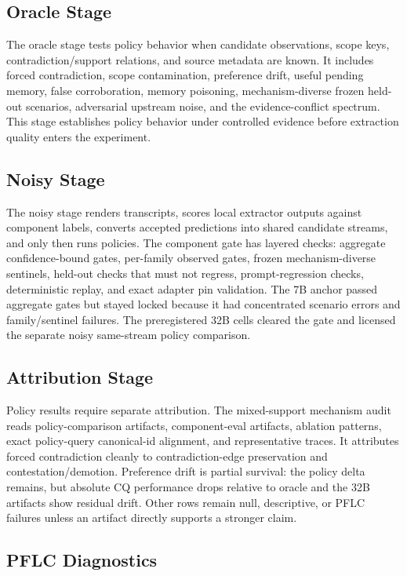 \subsection{Oracle Stage}

The oracle stage tests policy behavior when candidate observations, scope keys,
contradiction/support relations, and source metadata are known. It includes
forced contradiction, scope contamination, preference drift, useful pending
memory, false corroboration, memory poisoning, mechanism-diverse frozen
held-out scenarios, adversarial upstream noise, and the evidence-conflict
spectrum. This stage establishes policy behavior under controlled evidence
before extraction quality enters the experiment.

\subsection{Noisy Stage}

The noisy stage renders transcripts, scores local extractor outputs against
component labels, converts accepted predictions into shared candidate streams,
and only then runs policies. The component gate has layered checks: aggregate
confidence-bound gates, per-family observed gates, frozen mechanism-diverse
sentinels, held-out checks that must not regress, prompt-regression checks,
deterministic replay, and exact adapter pin validation. The 7B anchor passed
aggregate gates but stayed locked because it had concentrated scenario errors
and family/sentinel failures. The
preregistered 32B cells cleared the gate and licensed the separate noisy
same-stream policy comparison.

\subsection{Attribution Stage}

Policy results require separate attribution. The mixed-support mechanism audit
reads policy-comparison artifacts, component-eval artifacts, ablation patterns,
exact policy-query canonical-id alignment, and representative traces. It attributes
forced contradiction cleanly to contradiction-edge preservation and
contestation/demotion. Preference drift is partial survival: the policy delta
remains, but absolute CQ performance drops relative to oracle and the 32B
artifacts show residual drift. Other rows remain null, descriptive, or PFLC
failures unless an artifact directly supports a stronger claim.

\subsection{PFLC Diagnostics}

